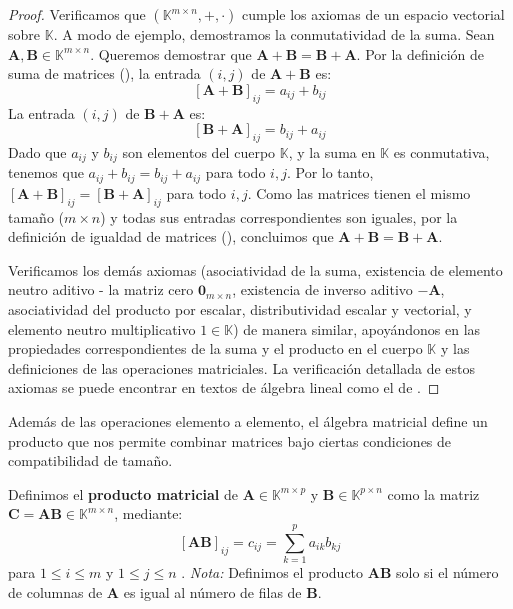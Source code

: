 \begin{proof}
Verificamos que $(\mathbb{K}^{m \times n}, +, \cdot)$ cumple los axiomas de un espacio vectorial sobre $\mathbb{K}$. A modo de ejemplo, demostramos la conmutatividad de la suma. Sean $\mathbf{A}, \mathbf{B} \in \mathbb{K}^{m \times n}$. Queremos demostrar que $\mathbf{A} + \mathbf{B} = \mathbf{B} + \mathbf{A}$.
Por la definición de suma de matrices (), la entrada $(i,j)$ de $\mathbf{A} + \mathbf{B}$ es:
\[ [\mathbf{A} + \mathbf{B}]_{ij} = a_{ij} + b_{ij} \]
La entrada $(i,j)$ de $\mathbf{B} + \mathbf{A}$ es:
\[ [\mathbf{B} + \mathbf{A}]_{ij} = b_{ij} + a_{ij} \]
Dado que $a_{ij}$ y $b_{ij}$ son elementos del cuerpo $\mathbb{K}$, y la suma en $\mathbb{K}$ es conmutativa, tenemos que $a_{ij} + b_{ij} = b_{ij} + a_{ij}$ para todo $i, j$.
Por lo tanto, $[\mathbf{A} + \mathbf{B}]_{ij} = [\mathbf{B} + \mathbf{A}]_{ij}$ para todo $i, j$.
Como las matrices tienen el mismo tamaño ($m \times n$) y todas sus entradas correspondientes son iguales, por la definición de igualdad de matrices (), concluimos que $\mathbf{A} + \mathbf{B} = \mathbf{B} + \mathbf{A}$.

Verificamos los demás axiomas (asociatividad de la suma, existencia de elemento neutro aditivo - la matriz cero $\mathbf{0}_{m \times n}$, existencia de inverso aditivo $-\mathbf{A}$, asociatividad del producto por escalar, distributividad escalar y vectorial, y elemento neutro multiplicativo $1 \in \mathbb{K}$) de manera similar, apoyándonos en las propiedades correspondientes de la suma y el producto en el cuerpo $\mathbb{K}$ y las definiciones de las operaciones matriciales. La verificación detallada de estos axiomas se puede encontrar en textos de álgebra lineal como el de \citet{Strang2016}.
\end{proof}

Además de las operaciones elemento a elemento, el álgebra matricial define un producto que nos permite combinar matrices bajo ciertas condiciones de compatibilidad de tamaño.

\begin{definition}
\label{def:matrix_product_general}
Definimos el \textbf{producto matricial} de $\mathbf{A} \in \mathbb{K}^{m \times p}$ y $\mathbf{B} \in \mathbb{K}^{p \times n}$ como la matriz $\mathbf{C} = \mathbf{A}\mathbf{B} \in \mathbb{K}^{m \times n}$, mediante:
\[ [\mathbf{A}\mathbf{B}]_{ij} = c_{ij} = \sum_{k=1}^{p} a_{ik} b_{kj} \]
para $1 \leq i \leq m$ y $1 \leq j \leq n$ \citep{Bishop2006}.
\emph{Nota:} Definimos el producto $\mathbf{A}\mathbf{B}$ solo si el número de columnas de $\mathbf{A}$ es igual al número de filas de $\mathbf{B}$.
\end{definition}

